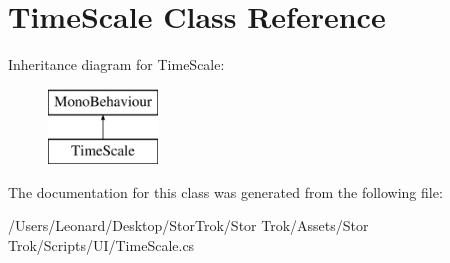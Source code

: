\hypertarget{class_time_scale}{}\section{Time\+Scale Class Reference}
\label{class_time_scale}
Inheritance diagram for Time\+Scale\+:\begin{figure}[H]
\begin{center}
\leavevmode
\includegraphics[height=2.000000cm]{class_time_scale}
\end{center}
\end{figure}


The documentation for this class was generated from the following file\+:\begin{DoxyCompactItemize}
\item 
/\+Users/\+Leonard/\+Desktop/\+Stor\+Trok/\+Stor Trok/\+Assets/\+Stor Trok/\+Scripts/\+U\+I/Time\+Scale.\+cs\end{DoxyCompactItemize}
